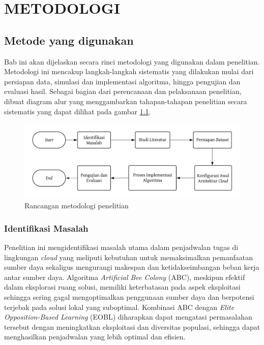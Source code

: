 \chapter{METODOLOGI}

\section{Metode yang digunakan}
Bab ini akan dijelaskan secara rinci metodologi yang digunakan dalam penelitian. Metodologi ini mencakup langkah-langkah sistematis yang dilakukan mulai dari persiapan data, simulasi dan implementasi algoritma, hingga pengujian dan evaluasi hasil. Sebagai bagian dari perencanaan dan pelaksanaan penelitian, dibuat diagram alur yang menggambarkan tahapan-tahapan penelitian secara sistematis yang dapat dilihat pada gambar \ref{figure:Flowchart Rancangan Metodologi Penelitian}.

\begin{figure} [H]
  \includegraphics[width=1\linewidth]{gambar/Flowchart Rancangan Metodologi Penelitian.png}
  \caption{Rancangan metodologi penelitian}
  \label{figure:Flowchart Rancangan Metodologi Penelitian}
\end{figure}

\subsection{Identifikasi Masalah}
Penelitian ini mengidentifikasi masalah utama dalam penjadwalan tugas di lingkungan \textit{cloud} yang meliputi kebutuhan untuk memaksimalkan pemanfaatan sumber daya sekaligus mengurangi makespan dan ketidakseimbangan beban kerja antar sumber daya. Algoritma \textit{Artificial Bee Colony} (ABC), meskipun efektif dalam eksplorasi ruang solusi, memiliki keterbatasan pada aspek eksploitasi sehingga sering gagal mengoptimalkan penggunaan sumber daya dan berpotensi terjebak pada solusi lokal yang suboptimal. Kombinasi ABC dengan \textit{Elite Opposition-Based Learning} (EOBL) diharapkan dapat mengatasi permasalahan tersebut dengan meningkatkan eksploitasi dan diversitas populasi, sehingga dapat menghasilkan penjadwalan yang lebih optimal dan efisien.

